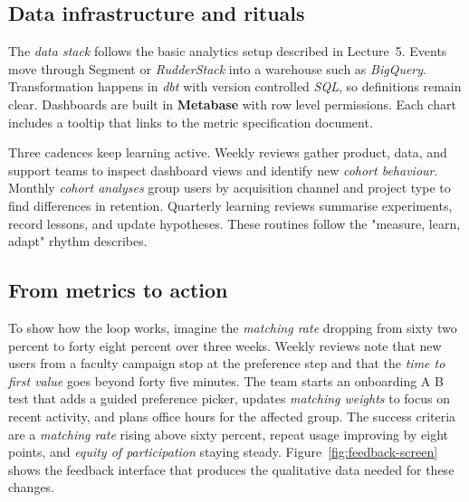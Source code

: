 \subsection*{Data infrastructure and rituals}
The \textit{data stack} follows the basic analytics setup described in Lecture~5. Events move through Segment or \textit{RudderStack} into a warehouse such as \textit{BigQuery}. Transformation happens in \textit{dbt} with version controlled \textit{SQL}, so definitions remain clear. Dashboards are built in \textbf{Metabase} with row level permissions. Each chart includes a tooltip that links to the metric specification document.

Three cadences keep learning active. Weekly reviews gather product, data, and support teams to inspect dashboard views and identify new \textit{cohort behaviour}. Monthly \textit{cohort analyses} group users by acquisition channel and project type to find differences in retention. Quarterly learning reviews summarise experiments, record lessons, and update hypotheses. These routines follow the "measure, learn, adapt" rhythm \citet{Choudary2016} describes.

\subsection*{From metrics to action}
To show how the loop works, imagine the \textit{matching rate} dropping from sixty two percent to forty eight percent over three weeks. Weekly reviews note that new users from a faculty campaign stop at the preference step and that the \textit{time to first value} goes beyond forty five minutes. The team starts an onboarding A B test that adds a guided preference picker, updates \textit{matching weights} to focus on recent activity, and plans office hours for the affected group. The success criteria are a \textit{matching rate} rising above sixty percent, repeat usage improving by eight points, and \textit{equity of participation} staying steady. Figure~\ref{fig:feedback-screen} shows the feedback interface that produces the qualitative data needed for these changes.

